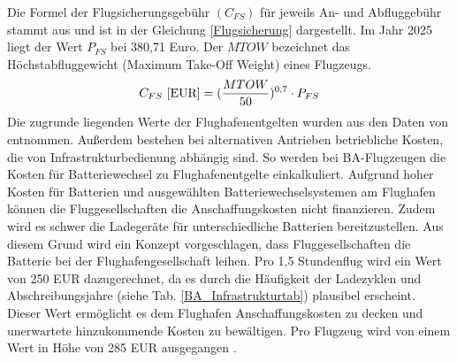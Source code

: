 Die Formel der Flugsicherungsgebühr $(C_{FS})$ für jeweils An- und Abfluggebühr stammt aus \cite{dfs_flugsicherungsgebuehren} und ist in der Gleichung \eqref{Flugsicherung}
dargestellt. Im Jahr 2025 liegt der Wert $P_{FS}$ bei 380,71 Euro. 
Der $MTOW$ bezeichnet das Höchstabfluggewicht (Maximum Take-Off Weight) eines Flugzeugs. 
\begin{equation}
	{C_{FS} ~[\text{EUR}]} = (\frac{MTOW}{50})^{0,7} \cdot P_{FS} \\
	\label{Flugsicherung}
 \end{equation}
Die zugrunde liegenden Werte der Flughafenentgelten wurden aus den Daten von \cite{fraport2025entgelte} entnommen.
Außerdem bestehen bei alternativen Antrieben betriebliche Kosten, die von Infrastrukturbedienung abhängig sind.
So werden bei BA-Flugzeugen die Kosten für Batteriewechsel zu Flughafenentgelte einkalkuliert. Aufgrund hoher Kosten für Batterien
und ausgewählten Batteriewechselsystemen am Flughafen können die Fluggesellschaften die Anschaffungskosten nicht finanzieren. 
Zudem wird es schwer die Ladegeräte für unterschiedliche 
Batterien bereitzustellen. Aus diesem Grund wird ein Konzept vorgeschlagen, dass
Fluggesellschaften die Batterie bei der Flughafengesellschaft leihen. 
Pro 1,5 Stundenflug wird ein Wert von 250 EUR dazugerechnet, 
da es durch die Häufigkeit der Ladezyklen und Abschreibungsjahre 
(siehe Tab. \ref{BA_Infrastrukturtab}) plausibel erscheint.
Dieser Wert ermöglicht es dem Flughafen Anschaffungskosten zu decken 
und unerwartete hinzukommende Kosten zu bewältigen.
Pro Flugzeug wird von einem Wert in Höhe von 285 EUR ausgegangen \cite{guo2023infrastructure}.

